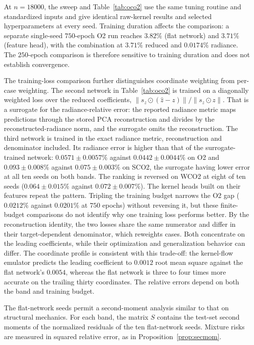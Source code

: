 At $n=18000$, the sweep and Table~\ref{tab:oco2} use the same tuning
routine and standardized inputs and give identical raw-kernel results and
selected hyperparameters at every seed.
Training duration affects the comparison: a separate single-seed
$750$-epoch O2 run reaches $3.82\%$ (flat network)
and $3.71\%$ (feature head), with the combination at $3.71\%$ reduced and $0.0174\%$
radiance. The $250$-epoch comparison is therefore sensitive to training
duration and does not establish convergence.

The training-loss comparison further distinguishes coordinate
weighting from per-case weighting. The second network in
Table~\ref{tab:oco2} is trained on a diagonally weighted loss over the
reduced coefficients, $\|s_z\odot(\hat z-z)\|/\|s_z\odot z\|$. That is a surrogate for the radiance-relative error: the reported radiance metric maps predictions through the stored PCA
reconstruction and divides by the reconstructed-radiance norm, and the
surrogate omits the reconstruction. The third network is trained in the
exact radiance metric, reconstruction and denominator included. Its
radiance error is higher than that of the surrogate-trained network:
$0.0571\pm0.0057\%$ against $0.0442\pm0.0044\%$ on O2
and $0.093\pm0.008\%$ against $0.075\pm0.003\%$ on SCO2, the surrogate having lower error at all ten seeds on both bands. The
ranking is reversed on WCO2 at eight of ten seeds
($0.064\pm0.015\%$ against $0.072\pm0.007\%$). The kernel heads built on
their features repeat the pattern. Tripling the training budget narrows the
O2 gap ($0.0212\%$ against $0.0201\%$ at $750$ epochs) without reversing it,
but these finite-budget comparisons do not identify why one training loss
performs better. By the reconstruction identity, the two losses share the
same numerator and differ in their target-dependent denominator, which
reweights cases. Both concentrate on the leading coefficients, while their
optimization and generalization behavior can differ. The coordinate
profile is consistent with this trade-off: the kernel-flow emulator
predicts the leading coefficient to $0.0012$ root mean square against the
flat network's $0.0054$, whereas the flat network is three to four times
more accurate on the trailing thirty coordinates. The relative errors depend on both the band and training budget.

The flat-network seeds permit a second-moment analysis similar to
that on structural mechanics.
For each band, the matrix $S$ contains the test-set second moments of the
normalized residuals of the ten flat-network seeds. Mixture risks are
measured in squared relative error, as in Proposition~\ref{prop:secmom}.

